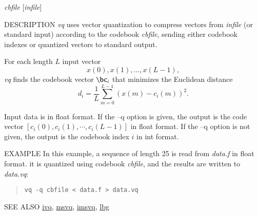 \begin{synopsis}
\item [vq] [ --l $L$ ] [ --n $N$ ] [ --q ] {\em cbfile} [{\em infile}]
\end{synopsis}

\begin{qsection}{DESCRIPTION}
{\em vq} uses vector quantization to compress vectors 
from {\em infile} (or standard input)
according to the codebook {\em cbfile}, 
sending either codebook indexes or quantized vectors to standard output.

For each length $L$ input vector
\begin{displaymath}
  x(0),x(1),\dots,x(L-1),
\end{displaymath}
{\em vq} finds the codebook vector $\bc_i$ 
that minimizes the Euclidean distance
\begin{displaymath}
d_i = \frac{1}{L}\sum_{m=0}^{L-1} (x(m)-c_i(m))^2. 
\end{displaymath}

Input data is in float format.
If the --q option is given, 
the output is the code vector $[c_i(0), c_i(1), \cdots, c_i(L-1)]$ 
in float format.
If the --q option is not given, 
the output is the codebook index $i$ in int format.
\end{qsection}

\begin{options}
\end{options}

\begin{qsection}{EXAMPLE}
In this example, a sequence of length 25 is read from {\em data.f}
in float format.
it is quantized using codebook {\em cbfile},
and the results are written to {\em data.vq}:
\begin{quote}
 \verb!vq -q cbfile < data.f > data.vq!
\end{quote} 
\end{qsection}

\begin{qsection}{SEE ALSO}
\hyperlink{ivq}{ivq},
\hyperlink{msvq}{msvq},
\hyperlink{imsvq}{imsvq},
\hyperlink{lbg}{lbg}
\end{qsection}
